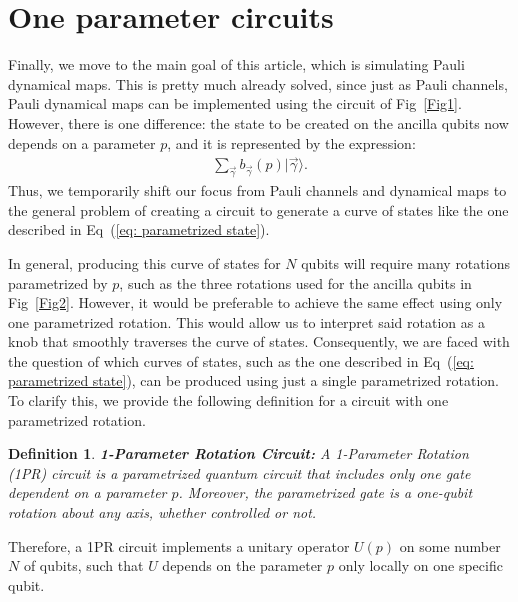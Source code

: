\documentclass[10pt,letterpaper]{article} %
\newcommand{\fref}[1]{Fig~\ref{#1}}
\newcommand{\eref}[1]{Eq~(\ref{#1})}
\newtheorem{definition}{Definition}
\begin{document}
\section{One parameter circuits} %
\label{sec: 1PR Circuits}

{\color{green}
Finally, we move to the main goal of this article, which is 
simulating Pauli dynamical maps.
This is pretty much already solved, since
just as Pauli channels, Pauli dynamical maps can be implemented using the circuit
of \fref{Fig1}.} However, there is one difference: 
the state to be created on the ancilla qubits now 
depends on a parameter $p$, and it is represented by the expression:
\begin{eqnarray}
\label{eq: parametrized state}
\sum_{\vec{\gamma}} b_{\vec{\gamma}}(p) |\vec{\gamma}\rangle.
\end{eqnarray}
Thus, we temporarily shift our focus from Pauli
channels and dynamical maps to the general problem of 
creating a circuit to generate a curve of
states like the one described in \eref{eq: parametrized state}.

In general, producing this curve of states for $N$ qubits will require
many rotations parametrized by $p$,
such as the three rotations used for the ancilla
qubits in \fref{Fig2}.
However, it would be preferable to achieve the same effect using only one parametrized rotation.
This would allow us to interpret said rotation 
as a knob that smoothly traverses the curve of states.
Consequently, we are faced with the question of which curves of states, 
such as the one described in \eref{eq: parametrized state}, 
can be produced using just a single parametrized rotation. 
To clarify this, we provide the following definition 
for a circuit with one parametrized rotation.

\begin{definition}{\textbf{1-Parameter Rotation Circuit:}}
A 1-Parameter Rotation (1PR) circuit is a parametrized quantum
circuit that includes only one gate dependent on a parameter $p$.
Moreover, the parametrized gate is a one-qubit rotation about any axis,
whether controlled or not.
\end{definition}
 
{\color{green}
Therefore, a 1PR circuit implements a unitary operator $U(p)$ on some number $N$ of qubits,
such that $U$ depends on the parameter $p$ only locally on one specific qubit.
}
\end{document}
